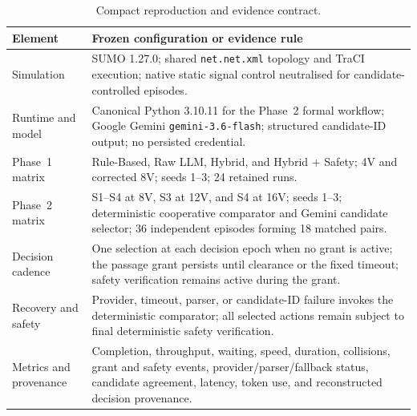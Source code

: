 \documentclass[letterpaper,10pt,conference]{ieeeconf}
\begin{document}
\begin{table}[t]

\centering

\caption{Compact reproduction and evidence contract.}

\label{tab:repro_summary}

\renewcommand{\arraystretch}{1.08}

\footnotesize

\begin{tabular}{p{2.6cm} p{11.5cm}}

\toprule

\textbf{Element} & \textbf{Frozen configuration or evidence rule} \\

\midrule

Simulation & SUMO 1.27.0; shared \texttt{net.net.xml} topology and TraCI execution; native static signal control neutralised for candidate-controlled episodes. \\

Runtime and model & Canonical Python 3.10.11 for the Phase~2 formal workflow; Google Gemini \texttt{gemini-3.6-flash}; structured candidate-ID output; no persisted credential. \\

Phase~1 matrix & Rule-Based, Raw LLM, Hybrid, and Hybrid + Safety; 4V and corrected 8V; seeds 1--3; 24 retained runs. \\

Phase~2 matrix & S1--S4 at 8V, S3 at 12V, and S4 at 16V; seeds 1--3; deterministic cooperative comparator and Gemini candidate selector; 36 independent episodes forming 18 matched pairs. \\

Decision cadence & One selection at each decision epoch when no grant is active; the passage grant persists until clearance or the fixed timeout; safety verification remains active during the grant. \\

Recovery and safety & Provider, timeout, parser, or candidate-ID failure invokes the deterministic comparator; all selected actions remain subject to final deterministic safety verification. \\

Metrics and provenance & Completion, throughput, waiting, speed, duration, collisions, grant and safety events, provider/parser/fallback status, candidate agreement, latency, token use, and reconstructed decision provenance. \\

\bottomrule

\end{tabular}

\end{table}
\end{document}
